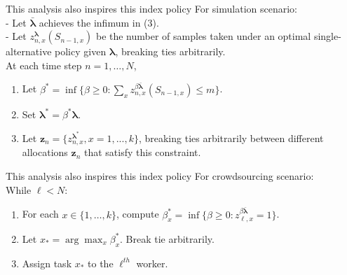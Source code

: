 \documentclass{beamer}
\newcommand{\lambdav}{\pmb{\lambda}}
\newcommand{\zv}{\mathbf{z}}
\begin{document}
\begin{frame}{This analysis also inspires this index policy}
For simulation scenario:\\
\vspace{3mm}
 - Let $\bar{\lambdav}$ achieves the infimum in (3).\\
 \vspace{2mm}
 - Let $z^{\lambdav}_{n,x}(S_{n-1,x})$ be the number of samples taken under an optimal single-alternative policy given $\lambdav$, breaking ties arbitrarily.\\
 \vspace{2mm}
 At each time step $n=1,\ldots,N$,
\begin{enumerate}
  \item Let $\beta^* = \inf \big\{\beta
  \geq 0: \sum_x z^{\beta\bar{\lambdav}}_{n,x}(S_{n-1,x})\leq m \big\}$.
  \item Set $\lambdav^* = \beta^* \lambdav$.
  \item Let $\mathbf{z}_n = \{z^{\lambdav^*}_{n,x},x = 1,...,k\}$, breaking ties arbitrarily between different allocations $\zv_n$ that satisfy this constraint.
\end{enumerate}

\end{frame}

\begin{frame}{This analysis also inspires this index policy}
For crowdsourcing scenario:\\
\vspace{7mm}
While $\ell<N$:
\begin{enumerate}
\item For each $x \in \{1,\ldots,k\}$, compute $\beta^*_x = \inf \{ \beta\geq 0 : z_{\ell,x}^{ \beta\bar{\lambdav}}= 1\}$.
\item Let $x_* = \arg\max_x{\beta^*_x}$. Break tie arbitrarily.
\item Assign task $x_*$ to the $\ell^{th}$ worker.
\end{enumerate}

\end{frame}
\end{document}
